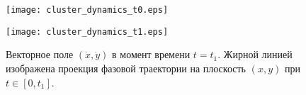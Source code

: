 \begin{figure}
	\begin{minipage}{0.48\textwidth}
		\centering
		\texttt{[image: cluster\_dynamics\_t0.eps]}
		\caption{Векторное поле $(\dot{x}, \dot{y})$ в момент времени $t = t_0$. Жирной линией изображена проекция фазовой траектории на плоскость $(x, y)$ при $t \in [0, t_0]$. %
		}
		\label{fig:dynamics_t0}
	\end{minipage}\hfill
	\begin{minipage}{0.48\textwidth}
		\centering
		\texttt{[image: cluster\_dynamics\_t1.eps]}
		\caption{Векторное поле $(\dot{x}, \dot{y})$ в момент времени $t = t_1$. Жирной линией изображена проекция фазовой траектории на плоскость $(x, y)$ при $t \in [0, t_1]$.}
		\label{fig:dynamics_t1}
	\end{minipage}
\end{figure}

